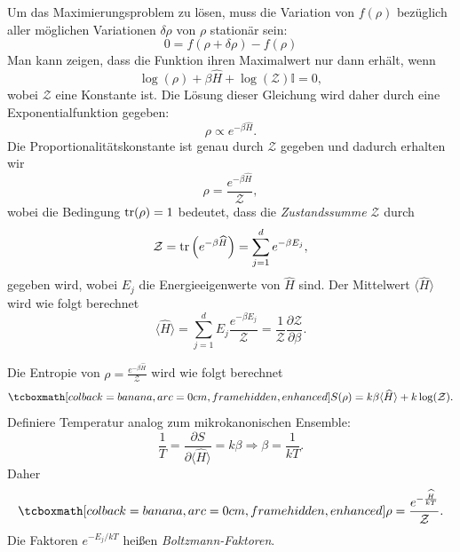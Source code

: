 Um das Maximierungsproblem zu lösen, muss die Variation von $f(\rho)$ bezüglich aller möglichen Variationen $\delta \rho$ von $\rho$ stationär sein:
\begin{equation}
	0= f(\rho + \delta\rho) -f(\rho)
\end{equation}
Man kann zeigen, dass die Funktion ihren Maximalwert nur dann erhält, wenn
\begin{equation}
	\log(\rho) + \beta \widehat{H} + \log(\mathcal{Z})\mathbb{I} = 0,
\end{equation}
wobei $\mathcal{Z}$ eine Konstante ist.
Die Lösung dieser Gleichung wird daher durch eine Exponentialfunktion gegeben:
\begin{equation}
	\rho \propto e^{-\beta \widehat{H}}.
\end{equation}
Die Proportionalitätskonstante ist genau durch $\mathcal{Z}$ gegeben und dadurch erhalten wir
\begin{equation}
	\rho = \frac{e^{-\beta \widehat{H}}}{\mathcal{Z}},
\end{equation}
wobei die Bedingung $\operatorname{tr}(\rho) = 1$ bedeutet, dass die \emph{Zustandssumme} $\mathcal{Z}$ durch
\begin{equation}
	\mathcal{Z} = \operatorname{tr}\left(e^{-\beta \widehat{H}}\right) = \sum_{j=1}^d e^{-\beta E_j},
\end{equation}
gegeben wird, wobei $E_j$ die Energieeigenwerte von $\widehat{H}$ sind. Der Mittelwert $\langle \widehat{H}\rangle$ wird wie folgt berechnet
\begin{equation}
	\langle \widehat{H}\rangle = \sum_{j=1}^d E_j \frac{e^{-\beta E_j}}{\mathcal{Z}} = \frac{1}{\mathcal{Z}}\frac{\partial \mathcal{Z}}{\partial \beta}.
\end{equation}

Die Entropie von $\rho=\frac{e^{-\beta \widehat{H}}}{\mathcal{Z}}$ wird wie folgt berechnet
\begin{equation}
	\eqbox{S(\rho) = k\beta\langle\widehat{H}\rangle + k\log(\mathcal{Z}).}
\end{equation}
Definiere Temperatur analog zum mikrokanonischen Ensemble:
\begin{equation}
	\frac{1}{T} = \frac{\partial S}{\partial \langle\widehat{H}\rangle} = k\beta \Rightarrow \beta = \frac{1}{kT}.
\end{equation}
Daher
\begin{equation}
	\eqbox{\rho = \frac{e^{-\frac{\widehat{H}}{kT}}}{\mathcal{Z}}.}
\end{equation}
Die Faktoren $e^{-E_j/kT}$ heißen \emph{Boltzmann-Faktoren}.

